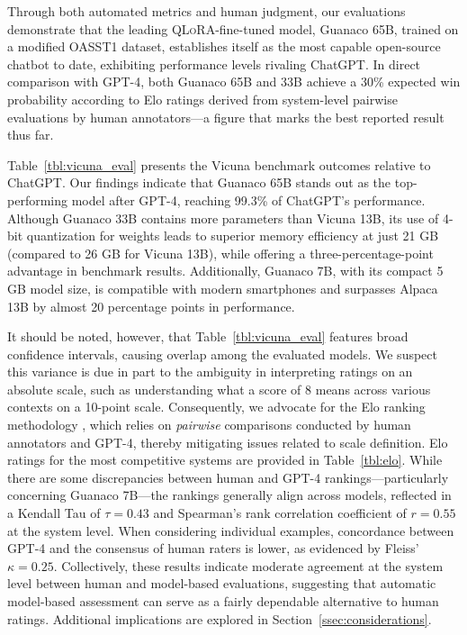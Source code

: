 Through both automated metrics and human judgment, our evaluations demonstrate that the leading \textsc{QLoRA}-fine-tuned model, {Guanaco} 65B, trained on a modified OASST1 dataset, establishes itself as the most capable open-source chatbot to date, exhibiting performance levels rivaling ChatGPT. In direct comparison with GPT-4, both {Guanaco} 65B and 33B achieve a 30\% expected win probability according to Elo ratings derived from system-level pairwise evaluations by human annotators—a figure that marks the best reported result thus far.

Table~\ref{tbl:vicuna_eval} presents the Vicuna benchmark outcomes \cite{vicuna2023} relative to ChatGPT. Our findings indicate that {Guanaco} 65B stands out as the top-performing model after GPT-4, reaching 99.3\% of ChatGPT's performance. Although {Guanaco} 33B contains more parameters than Vicuna 13B, its use of 4-bit quantization for weights leads to superior memory efficiency at just 21 GB (compared to 26 GB for Vicuna 13B), while offering a three-percentage-point advantage in benchmark results. Additionally, {Guanaco} 7B, with its compact 5 GB model size, is compatible with modern smartphones and surpasses Alpaca 13B by almost 20 percentage points in performance.

It should be noted, however, that Table~\ref{tbl:vicuna_eval} features broad confidence intervals, causing overlap among the evaluated models. We suspect this variance is due in part to the ambiguity in interpreting ratings on an absolute scale, such as understanding what a score of 8 means across various contexts on a 10-point scale. Consequently, we advocate for the Elo ranking methodology \citep{elo1967proposed}, which relies on \textit{pairwise} comparisons conducted by human annotators and GPT-4, thereby mitigating issues related to scale definition. Elo ratings for the most competitive systems are provided in Table~\ref{tbl:elo}. While there are some discrepancies between human and GPT-4 rankings—particularly concerning Guanaco 7B—the rankings generally align across models, reflected in a Kendall Tau of $\tau=0.43$ and Spearman's rank correlation coefficient of $r=0.55$ at the system level. When considering individual examples, concordance between GPT-4 and the consensus of human raters is lower, as evidenced by Fleiss’ $\kappa=0.25$. Collectively, these results indicate moderate agreement at the system level between human and model-based evaluations, suggesting that automatic model-based assessment can serve as a fairly dependable alternative to human ratings. Additional implications are explored in Section~\ref{ssec:considerations}.

